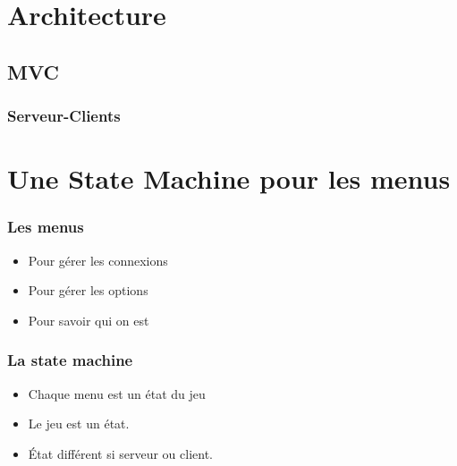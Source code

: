 \documentclass[pdf]{beamer}
\begin{document}
\section{Architecture}

\subsection{MVC}

\begin{frame}
  \frametitle{Serveur-Clients}
  \begin{figure}[h]
    \centering
  \end{figure}
\end{frame}

\section{Une State Machine pour les menus}

\begin{frame}
  \frametitle{Les menus}
    \begin{itemize}
        \item Pour gérer les connexions
        \item Pour gérer les options
        \item Pour savoir qui on est
    \end{itemize}
\end{frame}

\begin{frame}
    \frametitle{La state machine}
    \begin{itemize}
        \item Chaque menu est un état du jeu
        \item Le jeu est un état.
        \item État différent si serveur ou client.
    \end{itemize}
\end{frame}
\end{document}
